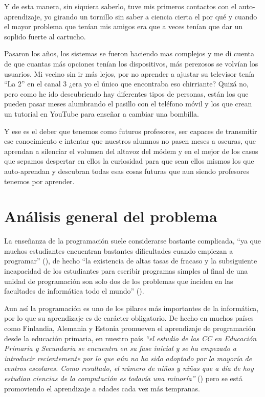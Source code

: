 \bigskip
Y de esta manera, sin siquiera saberlo, tuve mis primeros contactos con el auto-aprendizaje, yo girando un tornillo sin saber a ciencia cierta el por qué y cuando el mayor problema que tenían mis amigos era que a veces tenían que dar un soplido fuerte al cartucho.

\bigskip
Pasaron los años, los sistemas se fueron haciendo mas complejos y me di cuenta de que cuantas más opciones tenían los dispositivos, más perezosos se volvían los usuarios. Mi vecino sin ir más lejos, por no aprender a ajustar su televisor tenía ``La 2'' en el canal 3 ¿era yo el único que encontraba eso chirriante? Quizá no, pero como he ido descubriendo hay diferentes tipos de personas, están los que pueden pasar meses alumbrando el pasillo con el teléfono móvil y los que crean un tutorial en YouTube para enseñar a cambiar una bombilla.

\bigskip
Y ese es el deber que tenemos como futuros profesores, ser capaces de transmitir ese conocimiento e intentar que nuestros alumnos no pasen meses a oscuras, que aprendan a silenciar el volumen del altavoz del módem y en el mejor de los casos que sepamos despertar en ellos la curiosidad para que sean ellos mismos los que auto-aprendan y descubran todas esas cosas futuras que aun siendo profesores tenemos por aprender.

\section{Análisis general del problema}

La enseñanza de la programación suele considerarse bastante complicada, ``ya que muchos estudiantes encuentran bastantes dificultades cuando empiezan a programar'' (\cite{rubio_uso_2018}), de hecho ``la existencia de altas tasas de fracaso y la subsiguiente incapacidad de los estudiantes para escribir programas simples al final de una unidad de programación son solo dos de los problemas que inciden en las facultades de informática todo el mundo'' (\cite{bruce_contemporary_nodate}).

\bigskip
Aun así la programación es uno de los pilares más importantes de la informática, por lo que su aprendizaje es de carácter obligatorio. De hecho en muchos países como Finlandia, Alemania y Estonia promueven el aprendizaje de programación desde la educación primaria, en nuestro país \textit{``el estudio de las CC en Educación Primaria y Secundaria se encuentra en su fase inicial y se ha empezado a introducir recientemente por lo que aún no ha sido adoptado por la mayoría de centros escolares. Como resultado, el número de niños y niñas que a día de hoy estudian ciencias de la computación es todavía una minoría''} (\cite{fecyt_educacion_2016}) pero se está promoviendo el aprendizaje a edades cada vez más tempranas.

